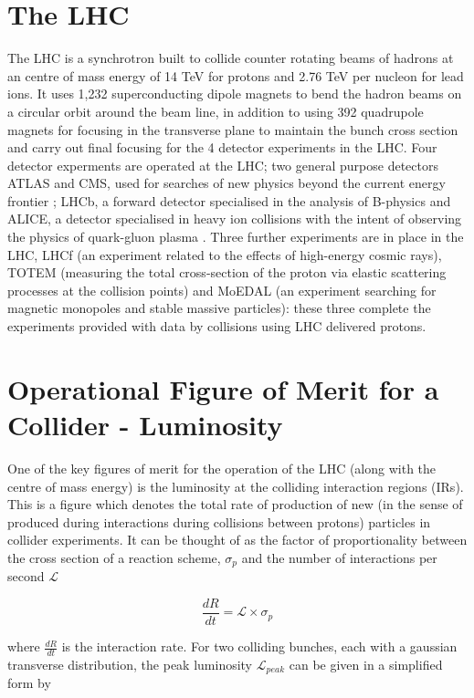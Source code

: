 \section{The LHC}

The LHC is a synchrotron built to collide counter rotating beams of hadrons at an centre of mass energy of 14 TeV for protons and 2.76 TeV per nucleon for lead ions. It uses 1,232 superconducting dipole magnets to bend the hadron beams on a circular orbit around the beam line, in addition to using 392 quadrupole magnets for focusing in the transverse plane to maintain the bunch cross section and carry out final focusing for the 4 detector experiments in the LHC. Four detector experments are operated at the LHC; two general purpose detectors ATLAS and CMS, used for searches of new physics beyond the current energy frontier \cite{ATLASTDR,CMSDR}; LHCb, a forward detector specialised in the analysis of B-physics \cite{LHCb} and ALICE, a detector specialised in heavy ion collisions with the intent of observing the physics of quark-gluon plasma \cite{Lourenco:ALICE}. Three further experiments are in place in the LHC, LHCf (an experiment related to the effects of high-energy cosmic rays), TOTEM (measuring the total cross-section of the proton via elastic scattering processes at the collision points) and MoEDAL (an experiment searching for magnetic monopoles and stable massive particles): these three complete the experiments provided with data by collisions using LHC delivered protons.

\section{Operational Figure of Merit for a Collider - Luminosity}

One of the key figures of merit for the operation of the LHC (along with the centre of mass energy) is the luminosity at the colliding interaction regions (IRs). This is a figure which denotes the total rate of production of new (in the sense of produced during interactions during collisions between protons) particles in collider experiments. It can be thought of as the factor of proportionality between the cross section of a reaction scheme, $\sigma_{p}$ and the number of interactions per second $\mathcal{L}$

\begin{equation} 
\frac{dR}{dt} = \mathcal{L} \times \sigma_{p}
\end{equation}

where $\frac{dR}{dt}$ is the interaction rate. For two colliding bunches, each with a gaussian transverse distribution, the peak luminosity $\mathcal{L}_{peak}$ can be given in a simplified form by

